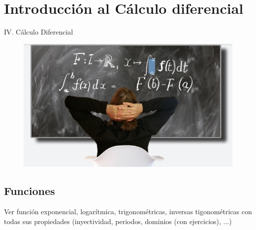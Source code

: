 \part{Introducción al Cálculo diferencial}

\null\vfill
\begin{Huge}\begin{center}
IV. Cálculo Diferencial	
\end{center}\end{Huge}

\vspace{1.5cm}

\begin{figure}[H]
	\centering
	\includegraphics[width=.9\textwidth]{imagenes/part4.png}	
\end{figure}
\par
\vfill


\chapter{Funciones}

\vspace{5mm}



Ver función exponencial, logarítmica, trigonométricas, inversas tigonométricas con todas sus propiedades (inyectividad, periodos, dominios (con ejercicios), ...)
























